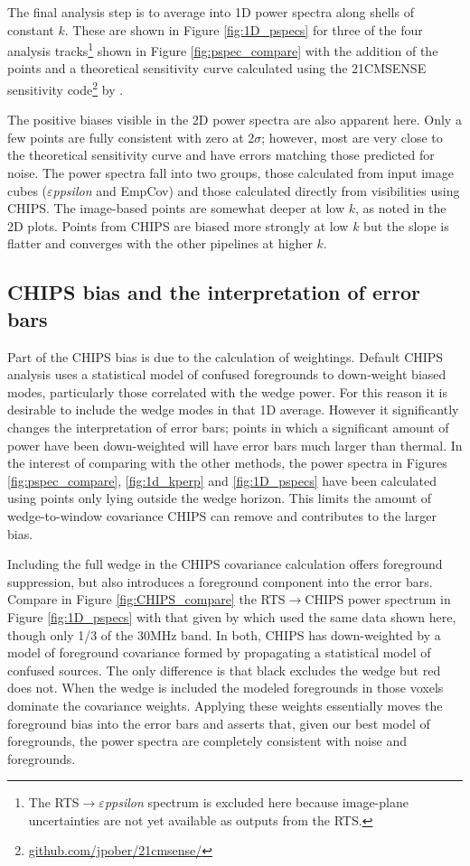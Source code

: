 \documentclass[twolcolumn,iop]{emulateapj}
\def\eppsilon{{\it $\varepsilon$ppsilon}}
\def\empirical{EmpCov}
\def\chipscite{\cite{2016arXiv160102073T}}
\def\dilloncite{\cite{PhysRevD.91.123011} }
\begin{document}
The final analysis step is to average into 1D power spectra along shells of constant $k$. These are shown in Figure \ref{fig:1D_pspecs} for three of the four analysis tracks\footnote{The RTS$\to$\eppsilon{} spectrum is excluded here because image-plane uncertainties are not yet available as outputs from the RTS.} shown in Figure \ref{fig:pspec_compare} with the addition of the \dilloncite{} points and a theoretical sensitivity curve calculated using the 21CMSENSE sensitivity code\footnote{\url{github.com/jpober/21cmsense/}} by \cite{Pober:2014p10390}.

The positive biases visible in the 2D power spectra are also apparent here. Only a few points are fully consistent with zero at 2$\sigma$; however, most are very close to the theoretical sensitivity curve and have errors matching those predicted for noise.
 The power spectra fall into two groups, those calculated from input image cubes (\eppsilon{} and \empirical{}) and those calculated directly from visibilities using CHIPS. The image-based points are somewhat deeper at low $k$, as noted in the 2D plots.  Points from CHIPS are biased more strongly at low $k$ but the slope is flatter and converges with the other pipelines at higher $k$.  

\subsection{CHIPS bias and the interpretation of error bars}
Part of the CHIPS bias is due to the calculation of weightings. Default CHIPS analysis uses a statistical model of confused foregrounds to down-weight biased modes, particularly those correlated with the wedge power. For this reason it is desirable to include the wedge modes in that 1D average. However it significantly changes the interpretation of error bars; points in which a significant amount of power have been down-weighted will have error bars much larger than thermal. In the interest of comparing with the other methods, the power spectra in Figures \ref{fig:pspec_compare}, \ref{fig:1d_kperp} and \ref{fig:1D_pspecs} have been calculated using points only lying outside the wedge horizon. This limits the amount of wedge-to-window covariance CHIPS can remove and contributes to the larger bias. 

Including the full wedge in the CHIPS covariance calculation offers foreground suppression, but also introduces a foreground component into the error bars. Compare in Figure \ref{fig:CHIPS_compare} the RTS$\to$CHIPS power spectrum in Figure \ref{fig:1D_pspecs} with that given by \chipscite{} which used the same data shown here, though only 1/3 of the 30MHz band.  In both, CHIPS has down-weighted by a model of foreground covariance formed by propagating a statistical model of confused sources. The only difference is that black excludes the wedge but red does not. When the wedge is included the modeled foregrounds in those voxels dominate the covariance weights. Applying these weights essentially moves the foreground bias into the error bars and asserts that, given our best model of foregrounds, the power spectra are completely consistent with noise and  foregrounds.
\end{document}
